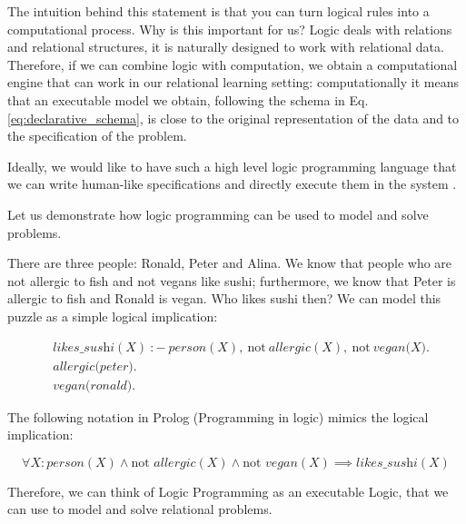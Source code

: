 The intuition behind this statement is that
you can turn logical rules into a computational process. 
Why is this important for us? Logic deals with
relations and relational structures, it is naturally designed to
work with relational data. Therefore, if we can combine logic
with computation, we obtain a computational engine that can work in
\pubrev
our relational learning setting: computationally it means that an
executable model we obtain, following the schema in Eq. \ref{eq:declarative_schema}, is close to the original representation of the data and to the specification of the problem.

Ideally, we would like to have such a high level logic programming language that we can write human-like specifications and directly execute them in the system \parencite{denecker}.
\pubrevend

Let us demonstrate how logic programming can be used to model and solve problems. 
\begin{example}
There are three people: Ronald, Peter and
Alina. We know that people who are not allergic to fish and not vegans like sushi; 
furthermore, we know that Peter is allergic to fish and Ronald is
    vegan. 
Who likes sushi then? We can model this puzzle as a
simple logical implication:

\begin{equation*}
    \begin{aligned}
& \textit{likes\_sushi}(X)~{:}{-}~\textit{person}(X),~\text{not}~
        \textit{allergic}(X), ~\text{not}~\textit{vegan(X)}. \\
&       \textit{allergic(peter)}. \\
&       \textit{vegan(ronald)}.
    \end{aligned}
\end{equation*}

The following notation in Prolog (Programming in logic)
\parencite{prolog_original} mimics the logical implication:

\begin{equation}\label{eq:sushi}
  \forall X: \textit{person}(X) \wedge \text{not }
    \textit{allergic}(X) \wedge \text{not } \textit{vegan}(X)
  \implies \textit{likes\_sushi}(X)
\end{equation}
\end{example}
Therefore, we can think of Logic Programming as an executable Logic, that
we can use to model and solve relational problems.

